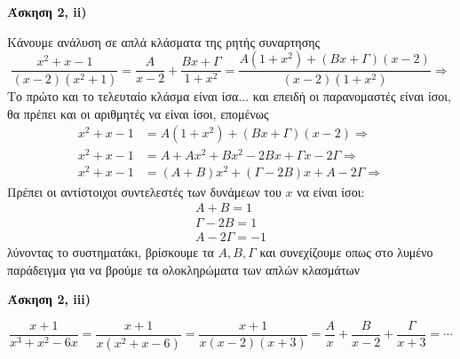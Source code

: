 





\textbf{Άσκηση 2, ii)}

Κάνουμε ανάλυση σε απλά κλάσματα της ρητής συναρτησης
\[
  \frac{x^{2}+x-1}{(x-2)(x^{2}+1)} = \frac{A}{x-2} + \frac{Bx+\Gamma}{1+x^{2}} = 
  \frac{A(1+x^{2})+(Bx+\Gamma)(x-2)}{(x-2)(1+x^{2})} \Rightarrow 
\]
Το πρώτο και το τελευταίο κλάσμα είναι ίσα... και επειδή οι παρανομαστές είναι ίσοι, θα 
πρέπει και οι αριθμητές να είναι ίσοι, επομένως
\begin{align*}
  x^{2}+x-1 &= {A(1+x^{2})+(Bx+\Gamma)(x-2)} \Rightarrow  \\
  x^{2}+x-1 &= A+Ax^{2}+Bx^{2}-2Bx+\Gamma x -2\Gamma \Rightarrow  \\
  x^{2}+x-1 &= (A+B)x^{2}+(\Gamma -2B)x + A-2\Gamma \Rightarrow 
\end{align*}
Πρέπει οι αντίστοιχοι συντελεστές των δυνάμεων του $x$ να είναι ίσοι:
\begin{align*}
  A+B=1 \\
  \Gamma-2B=1 \\
  A-2\Gamma = -1
\end{align*}
λύνοντας το συστηματάκι, βρίσκουμε τα $ A,B, \Gamma $ και συνεχίζουμε οπως στο λυμένο 
παράδειγμα για να βρούμε τα ολοκληρώματα των απλών κλασμάτων

\vspace{\baselineskip}

\textbf{Άσκηση 2, iii)}

\[
   \frac{x+1}{x^{3}+x^{2}-6x} = \frac{x+1}{x(x^{2}+x-6)} = \frac{x+1}{x(x-2)(x+3)} =
   \frac{A}{x} + \frac{B}{x-2} + \frac{\Gamma}{x+3} = \cdots 
   \] 


